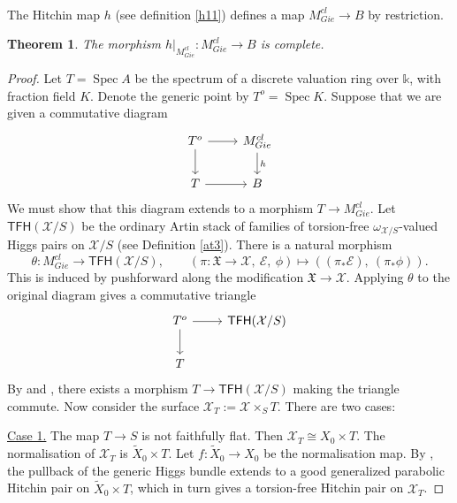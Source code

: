 \documentclass[11pt]{amsart}
\newcommand {\TFH} {\mathsf{TFH}}
\DeclareMathOperator{\Spec}{Spec}
\theoremstyle{plain}
\numberwithin{equation}{section}
\theoremstyle{definition}
\theoremstyle{plain}
\newtheorem{Thm}[Def]{Theorem}
\begin{document}
\

The Hitchin map $h$ (see definition \ref{h11}) defines a map $M^{cl}_{Gie}\to B$ by restriction. 

\begin{Thm}\label{complete11}
The morphism $h|_{M^{cl}_{Gie}} \colon M^{cl}_{Gie} \longrightarrow B$ is complete.
\end{Thm}


\begin{proof}
    Let $  T = \Spec A  $ be the spectrum of a discrete valuation ring over $  \mathbb{k}  $, with fraction field $  K  $. Denote the generic point by $  T^o = \Spec K  $. Suppose that we are given a commutative diagram
\begin{equation}\label{ref55667}
\begin{tikzcd}
T^o\arrow{r} \arrow{d} &M^{cl}_{Gie}\arrow["h"]{d}\\
T\arrow{r}& B
\end{tikzcd}
\end{equation}
We must show that this diagram extends to a morphism $  T \to M^{cl}_{Gie}  $.
Let $  \TFH(\mathcal{X}/S)  $ be the ordinary Artin stack of families of torsion-free $  \omega_{\mathcal{X}/S}  $-valued Higgs pairs on $  \mathcal{X}/S  $ (see Definition \ref{at3}). There is a natural morphism
$$\theta \colon M^{cl}_{Gie} \longrightarrow \TFH(\mathcal{X}/S),
\qquad (\pi \colon \mathfrak{X} \to \mathcal{X},\ \mathcal{E},\ \phi) \mapsto ((\pi_* \mathcal{E}),\ (\pi_* \phi)).$$
This is induced by pushforward along the modification $  \mathfrak{X} \to \mathcal{X}  $. Applying $  \theta  $ to the original diagram gives a commutative triangle
\begin{equation}
\begin{tikzcd}
T^o\arrow{r} \arrow{d} & \TFH(\mathcal X/S)\\
T
\end{tikzcd}
\end{equation}
By \cite[Proposition 6]{La} and \cite[Lemma 6.5]{17a}, there exists a morphism $  T \to \TFH(\mathcal{X}/S)  $ making the triangle commute.
Now consider the surface $  \mathcal{X}_T := \mathcal{X} \times_S T  $. There are two cases:

\medskip

\underline{Case 1.} The map $  T \to S  $ is not faithfully flat.
Then $  \mathcal{X}_T \cong X_0 \times T  $. The normalisation of $  \mathcal{X}_T  $ is $  \widetilde{X}_0 \times T  $. Let $  f \colon \widetilde{X}_0 \to X_0  $ be the normalisation map. By \cite[Proposition 3.2]{DI}, the pullback of the generic Higgs bundle extends to a good generalized parabolic Hitchin pair on $  \widetilde{X}_0 \times T  $, which in turn gives a torsion-free Hitchin pair on $  \mathcal{X}_T  $.


\end{proof}
\end{document}
